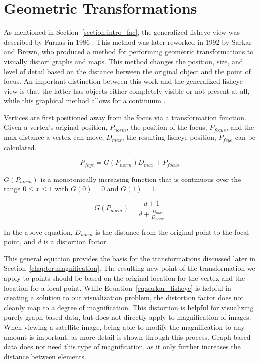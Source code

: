 \section{Geometric Transformations}
\label{section:prev_geometric_transformations}

As mentioned in Section~\ref{section:intro_fac}, the generalized fisheye view was described by Furnas in 1986 \cite{Furnas1986}. This method was later reworked in 1992 by Sarkar and Brown, who produced a method for performing geometric transformations to visually distort graphs and maps. This method changes the position, size, and level of detail based on the distance between the original object and the point of focus. An important distinction between this work and the generalized fisheye view is that the latter has objects either completely visible or not present at all, while this graphical method allows for a continuum \cite{Sarkar1992}.

Vertices are first positioned away from the focus via a transformation function. Given a vertex's original position, $P_{norm}$, the position of the focus, $P_{focus}$, and the max distance a vertex can move, $D_{max}$, the resulting fisheye position, $P_{feye}$ can be calculated.

\begin{equation}
    \label{eq:sarkar_fisheye} 
    P_{feye} = G(P_{norm})D_{max} + P_{focus}
\end{equation}

$G(P_{norm})$ is a monotonically increasing function that is continuous over the range $0 \leq x \leq 1$ with $G(0) = 0$ and $G(1) = 1$. 

\begin{equation}
    \label{eq:g_sarkar} 
    G(P_{norm}) = \frac{d + 1}{d + \frac{D_{max}}{D_{norm}}}
\end{equation}

In the above equation, $D_{norm}$ is the distance from the original point to the focal point, and $d$ is a distortion factor.

This general equation provides the basis for the transformations discussed later in Section~\ref{chapter:magnification}. The resulting new point of the transformation we apply to points should be based on the original location for the vertex and the location for a focal point. While Equation~\ref{eq:sarkar_fisheye} is helpful in creating a solution to our visualization problem, the distortion factor does not cleanly map to a degree of magnification. This distortion is helpful
for visualizing purely graph based data, but does not directly apply to magnification of images. When viewing a satellite image, being able to modify the magnification to any amount is important, as more detail is shown through this process. Graph based data does not need this type of magnification, as it only further increases the distance between elements.

